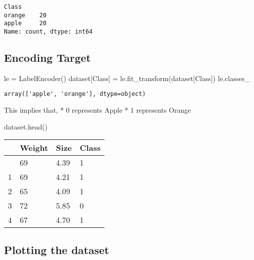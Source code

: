 \documentclass[
  letterpaper,
  DIV=11,
  numbers=noendperiod]{scrreprt}
\newenvironment{Shaded}{\begin{snugshade}}{\end{snugshade}}
\newcommand{\NormalTok}[1]{\textcolor[rgb]{0.00,0.23,0.31}{#1}}
\newcommand{\OperatorTok}[1]{\textcolor[rgb]{0.37,0.37,0.37}{#1}}
\newcommand{\StringTok}[1]{\textcolor[rgb]{0.13,0.47,0.30}{#1}}
\begin{document}
\begin{verbatim}
Class
orange    20
apple     20
Name: count, dtype: int64
\end{verbatim}

\subsection{Encoding Target}\label{encoding-target}

\begin{Shaded}
\begin{Highlighting}[]
\NormalTok{le }\OperatorTok{=}\NormalTok{ LabelEncoder()}
\NormalTok{dataset[}\StringTok{\textquotesingle{}Class\textquotesingle{}}\NormalTok{] }\OperatorTok{=}\NormalTok{ le.fit\_transform(dataset[}\StringTok{\textquotesingle{}Class\textquotesingle{}}\NormalTok{])}
\NormalTok{le.classes\_}
\end{Highlighting}
\end{Shaded}

\begin{verbatim}
array(['apple', 'orange'], dtype=object)
\end{verbatim}

This implies that, * 0 represents Apple * 1 represents Orange

\begin{Shaded}
\begin{Highlighting}[]
\NormalTok{dataset.head()}
\end{Highlighting}
\end{Shaded}

\begin{longtable}[]{@{}llll@{}}
\toprule\noalign{}
& Weight & Size & Class \\
\midrule\noalign{}
\endhead
\bottomrule\noalign{}
\endlastfoot
0 & 69 & 4.39 & 1 \\
1 & 69 & 4.21 & 1 \\
2 & 65 & 4.09 & 1 \\
3 & 72 & 5.85 & 0 \\
4 & 67 & 4.70 & 1 \\
\end{longtable}

\subsection{Plotting the dataset}\label{plotting-the-dataset}
\end{document}
